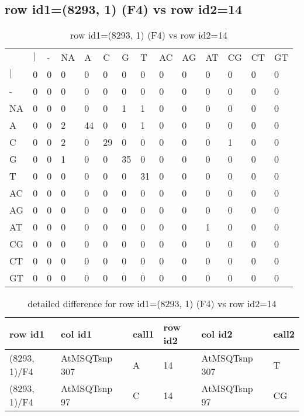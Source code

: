 \subsection{row id1=(8293, 1) (F4) vs row id2=14}
\begin{center}
\begin{longtable}{|l|l|l|l|l|l|l|l|l|l|l|l|l|l|}
\caption{row id1=(8293, 1) (F4) vs row id2=14} \label{table_dm264}\\
\hline
\\
\hline
&$|$&-&NA&A&C&G&T&AC&AG&AT&CG&CT&GT\\
$|$&0&0&0&0&0&0&0&0&0&0&0&0&0\\
-&0&0&0&0&0&0&0&0&0&0&0&0&0\\
NA&0&0&0&0&0&1&1&0&0&0&0&0&0\\
A&0&0&2&44&0&0&1&0&0&0&0&0&0\\
C&0&0&2&0&29&0&0&0&0&0&1&0&0\\
G&0&0&1&0&0&35&0&0&0&0&0&0&0\\
T&0&0&0&0&0&0&31&0&0&0&0&0&0\\
AC&0&0&0&0&0&0&0&0&0&0&0&0&0\\
AG&0&0&0&0&0&0&0&0&0&0&0&0&0\\
AT&0&0&0&0&0&0&0&0&0&1&0&0&0\\
CG&0&0&0&0&0&0&0&0&0&0&0&0&0\\
CT&0&0&0&0&0&0&0&0&0&0&0&0&0\\
GT&0&0&0&0&0&0&0&0&0&0&0&0&0\\
\hline
\end{longtable}
\end{center}

\begin{center}
\begin{longtable}{|l|l|l|l|l|l|}
\caption{detailed difference for row id1=(8293, 1) (F4) vs row id2=14} \label{table_dm265}\\
\hline
row id1&col id1&call1&row id2&col id2&call2\\
\hline
(8293, 1)/F4&AtMSQTsnp 307&A&14&AtMSQTsnp 307&T\\
(8293, 1)/F4&AtMSQTsnp 97&C&14&AtMSQTsnp 97&CG\\
\hline
\end{longtable}
\end{center}

